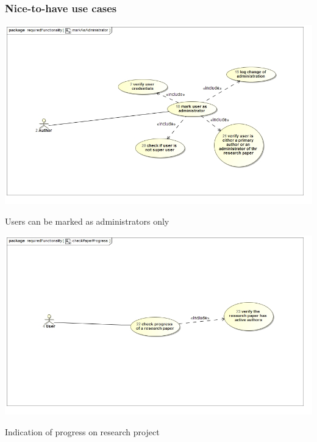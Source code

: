 \documentclass[a4paper,12pt]{report}
\begin{document}
\subsubsection{Nice-to-have use cases}

\begin{flushleft}
	\includegraphics[scale=0.5]{./images/uc__markAsAdministrator.jpg}
	\begin{center}
		Users can be marked as administrators only
	\end{center}

	\includegraphics[scale=0.5]{./images/uc__checkPaperProgress.jpg} 
	\begin{center}
		Indication of progress on research project
	\end{center}
\end{flushleft}

\newpage
\end{document}
